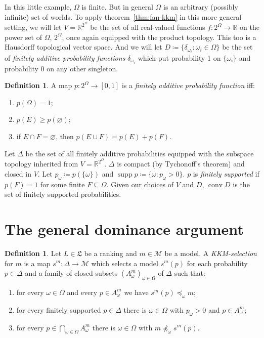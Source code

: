 \documentclass[11pt]{article}
\theoremstyle{definition}
\newtheorem{definition}[theorem]{Definition}
\theoremstyle{remark}
\newcommand{\M}{\mathcal M}
\newcommand{\supp}{\operatorname{supp}}
\begin{document}
In this little example, $\Omega$ is finite. But in general $\Omega$ is an arbitrary (possibly infinite) set of worlds. To apply theorem~\ref{thm:fan-kkm} in this more general setting, we will let $V=\mathbb R^{2^\Omega}$ be the set of all real-valued functions $f:2^\Omega\rightarrow\mathbb R$ on the power set of $\Omega$, $2^\Omega$, once again equipped with the product topology. This too is a Hausdorff topological vector space. And we will let $D\coloneqq\{\delta_{\omega_i}:\omega_i\in\Omega\}$ be the set of \textit{finitely additive probability functions} $\delta_{\omega_i}$ which put probability 1 on $\{\omega_i\}$ and probability 0 on any other singleton. 


\begin{definition}\label{def:finitely-additive-probability}
A map $p:2^\Omega\to[0,1]$ is a \emph{finitely additive probability function} iff:
\begin{enumerate}[label=\textup{(FA\arabic*)}]
  \item $p(\Omega)=1$;
  \item $p(E)\geq p(\varnothing)$;
  \item if $E\cap F=\varnothing$, then $p(E\cup F)=p(E)+p(F)$.
\end{enumerate}
\end{definition}


Let $\Delta$ be the set of all finitely additive probabilities equipped with the subspace topology inherited from $V=\mathbb R^{2^\Omega}$. $\Delta$ is compact (by Tychonoff's theorem) and closed in $V$. Let $p_\omega\coloneqq p(\{\omega\})$ and $\supp p\coloneqq\{\omega:p_\omega>0\}$.  $p$ is \emph{finitely supported} if $p(F)=1$ for some finite $F\subseteq\Omega$. Given our choices of $V$ and $D$, $\operatorname{conv}D$ is the set of finitely supported probabilities.








\section{The general dominance argument}\label{sec:gen-dom}

\begin{definition}\label{def:selection}\label{def:selection-data}
Let $L\in\mathfrak L$ be a ranking and $m\in\M$ be a model. A \textit{KKM-selection} for $m$ is a map $s^m:\Delta\to\M$ which selects a model $s^m(p)$ for each probability $p\in\Delta$ and a family of closed subsets $(A^m_\omega)_{\omega\in\Omega}$ of $\Delta$ such that:
\begin{enumerate}[label=(S\arabic*),leftmargin=3em]
\item\label{S1} for every $\omega\in\Omega$ and every $p\in A^m_\omega$ we have $s^m(p)\preceq_\omega m$;
\item\label{S2} for every finitely supported $p\in\Delta$ there is $\omega\in\Omega$ with $p_\omega>0$ and $p\in A^m_\omega$;
\item\label{S3} for every $p\in\bigcap_{\omega\in\Omega}A^m_\omega$ there is $\omega\in\Omega$ with $m\not\preceq_\omega s^m(p)$.
\end{enumerate}
\end{definition}
\end{document}
